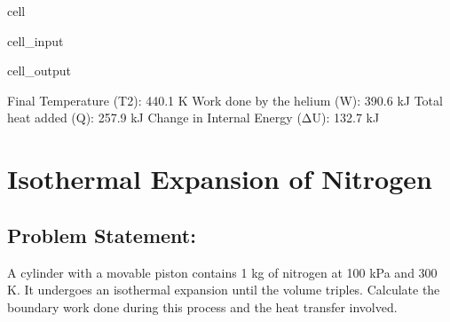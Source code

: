 \documentclass[letterpaper,10pt,english]{jupyterBook}
\begin{document}
\begin{sphinxuseclass}{cell}
\begin{sphinxVerbatimInput}
\begin{sphinxuseclass}{cell_input}
\begin{sphinxVerbatim}[commandchars=\\\{\}]
\end{sphinxVerbatim}

\end{sphinxuseclass}\end{sphinxVerbatimInput}
\begin{sphinxVerbatimOutput}

\begin{sphinxuseclass}{cell_output}
\begin{sphinxVerbatim}[commandchars=\\\{\}]
Final Temperature (T2): 440.1 K
Work done by the helium (W): \PYGZhy{}390.6 kJ
Total heat added (Q): \PYGZhy{}257.9 kJ
Change in Internal Energy (ΔU): 132.7 kJ
\end{sphinxVerbatim}

\end{sphinxuseclass}\end{sphinxVerbatimOutput}

\end{sphinxuseclass}
\sphinxstepscope


\section{Isothermal Expansion of Nitrogen}
\label{\detokenize{notebooks/Chapter4/Isothermal_Expansion_Nitrogen_Problem_7:isothermal-expansion-of-nitrogen}}\label{\detokenize{notebooks/Chapter4/Isothermal_Expansion_Nitrogen_Problem_7::doc}}

\subsection{Problem Statement:}
\label{\detokenize{notebooks/Chapter4/Isothermal_Expansion_Nitrogen_Problem_7:problem-statement}}
\sphinxAtStartPar
A cylinder with a movable piston contains 1 kg of nitrogen at 100 kPa and 300 K.
It undergoes an isothermal expansion until the volume triples.
Calculate the boundary work done during this process and the heat transfer involved.
\end{document}
